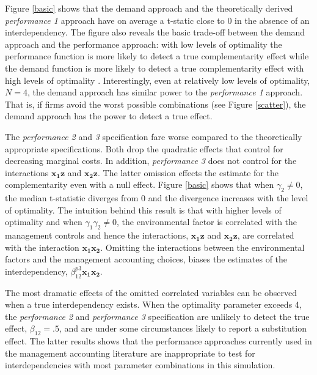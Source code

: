\documentclass[12pt]{article}
\begin{document}
Figure \ref{basic} shows that the demand approach and the theoretically
derived \emph{performance 1} approach have on average a t-static close
to 0 in the absence of an interdependency. The figure also reveals the
basic trade-off between the demand approach and the performance
approach: with low levels of optimality the performance function is more
likely to detect a true complementarity effect while the demand function
is more likely to detect a true complementarity effect with high levels
of optimality \citep{Grabner2013, Aral2012}. Interestingly, even at
relatively low levels of optimality, \(N = 4\), the demand approach has
similar power to the \emph{performance 1} approach. That is, if firms
avoid the worst possible combinations (see Figure \ref{scatter}), the
demand approach has the power to detect a true effect.

The \emph{performance 2} and \emph{3} specification fare worse compared
to the theoretically appropriate specifications. Both drop the quadratic
effects that control for decreasing marginal costs. In addition,
\emph{performance 3} does not control for the interactions
\(\mathbf{x_1z}\) and \(\mathbf{x_2z}\). The latter omission effects the
estimate for the complementarity even with a null effect. Figure
\ref{basic} shows that when \(\gamma_2 \neq 0\), the median t-statistic
diverges from 0 and the divergence increases with the level of
optimality. The intuition behind this result is that with higher levels
of optimality and when \(\gamma_1 \gamma_2 \neq 0\), the environmental
factor is correlated with the management controls and hence the
interactions, \(\mathbf{x_1z}\) and \(\mathbf{x_2z}\), are correlated
with the interaction \(\mathbf{x_1 x_2}\). Omitting the interactions
between the environmental factors and the management accounting choices,
biases the estimates of the interdependency,
\(\beta_{12}^{p3} \mathbf{x_1 x_2}\).

The most dramatic effects of the omitted correlated variables can be
observed when a true interdependency exists. When the optimality
parameter exceeds 4, the \emph{performance 2} and \emph{performance 3}
specification are unlikely to detect the true effect,
\(\beta_{12} = .5\), and are under some circumstances likely to report a
substitution effect. The latter results shows that the performance
approaches currently used in the management accounting literature are
inappropriate to test for interdependencies with most parameter
combinations in this simulation.
\end{document}
